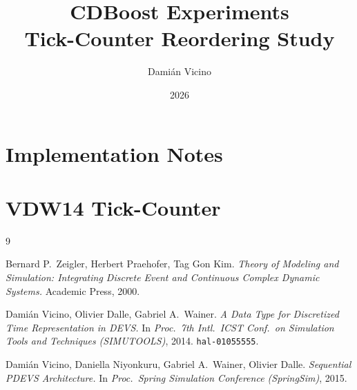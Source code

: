 \documentclass[11pt,a4paper]{article}
\title{CDBoost Experiments\\
  \large Tick-Counter Reordering Study}
\author{Damián Vicino}
\date{2026}
\begin{document}
\maketitle
\tableofcontents
\clearpage

\section{Implementation Notes}


\clearpage
\section{VDW14 Tick-Counter}


\begin{thebibliography}{9}

  Bernard P.\ Zeigler, Herbert Praehofer, Tag Gon Kim.
  \textit{Theory of Modeling and Simulation: Integrating Discrete Event
  and Continuous Complex Dynamic Systems.}
  Academic Press, 2000.

  Damián Vicino, Olivier Dalle, Gabriel A.\ Wainer.
  \textit{A Data Type for Discretized Time Representation in DEVS.}
  In \textit{Proc.\ 7th Intl.\ ICST Conf.\ on Simulation Tools and
  Techniques (SIMUTOOLS)}, 2014.
  \texttt{hal-01055555}.

  Damián Vicino, Daniella Niyonkuru, Gabriel A.\ Wainer, Olivier Dalle.
  \textit{Sequential PDEVS Architecture.}
  In \textit{Proc.\ Spring Simulation Conference (SpringSim)}, 2015.

\end{thebibliography}
\end{document}
